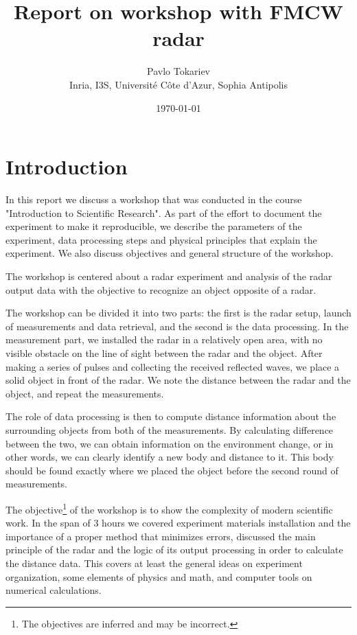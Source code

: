 \documentclass{article}
\title{Report on workshop with FMCW radar}
\author{Pavlo Tokariev\\Inria, I3S, Université Côte d'Azur, Sophia Antipolis}
\date{\today}
\begin{document}
\maketitle

\section{Introduction}
\label{sec:introduction}

In this report we discuss a workshop that was conducted in the course "Introduction to Scientific Research".
As part of the effort to document the experiment to make it reproducible, we describe the parameters of the experiment, data processing steps and physical principles that explain the experiment.
We also discuss objectives and general structure of the workshop.

The workshop is centered about a radar experiment and analysis of the radar output data with the objective to recognize an object opposite of a radar.

The workshop can be divided it into two parts: the first is the radar setup, launch of measurements and data retrieval, and the second is the data processing.
In the measurement part, we installed the radar in a relatively open area, with no visible obstacle on the line of sight between the radar and the object.
After making a series of pulses and collecting the received reflected waves, we place a solid object in front of the radar.
We note the distance between the radar and the object, and repeat the measurements.

The role of data processing is then to compute distance information about the surrounding objects from both of the measurements.
By calculating difference between the two, we can obtain information on the environment change, or in other words, we can clearly identify a new body and distance to it.
This body should be found exactly where we placed the object before the second round of measurements.

The objective\footnote{The objectives are inferred and may be incorrect.} of the workshop is to show the complexity of modern scientific work.
In the span of 3 hours we covered experiment materials installation and the importance of a proper method that minimizes errors, discussed the main principle of the radar and the logic of its output processing in order to calculate the distance data.
This covers at least the general ideas on experiment organization, some elements of physics and math, and computer tools on numerical calculations.
\end{document}
